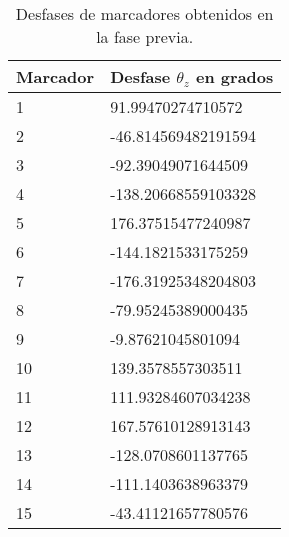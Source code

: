 \begin{table}[H]
	\centering
	\begin{tabular}{|l|l|}
		\hline
		\textbf{Marcador} & \textbf{Desfase $\theta _{z}$ en grados} \\ \hline
		1                 & 91.99470274710572                      \\ \hline
		2                 & -46.814569482191594                    \\ \hline
		3                 & -92.39049071644509                     \\ \hline
		4                 & -138.20668559103328                    \\ \hline
		5                 & 176.37515477240987                     \\ \hline
		6                 & -144.1821533175259                     \\ \hline
		7                 & -176.31925348204803                    \\ \hline
		8                 & -79.95245389000435                     \\ \hline
		9                 & -9.87621045801094                      \\ \hline
		10                & 139.3578557303511                      \\ \hline
		11                & 111.93284607034238                     \\ \hline
		12                & 167.57610128913143                     \\ \hline
		13                & -128.0708601137765                     \\ \hline
		14                & -111.1403638963379                     \\ \hline
		15                & -43.41121657780576                     \\ \hline
	\end{tabular}
	\caption{Desfases de marcadores obtenidos en la fase previa.}
	\label{cuadro:desfases_anteriores}
\end{table}

